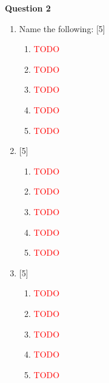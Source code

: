 \newpage
\par
\noindent
\textbf{Question 2}\\
\begin{enumerate}[label=(\roman*)]

    \item Name the following: \hfill [5]
        \begin{enumerate}[label=(\alph*)]
            \setlength\itemsep{0em}
            \item \textcolor{red}{TODO} 
            \item \textcolor{red}{TODO} 
            \item \textcolor{red}{TODO} 
            \item \textcolor{red}{TODO} 
            \item \textcolor{red}{TODO} 
        \end{enumerate}

    \item \hfill [5]
        \begin{enumerate}[label=(\alph*)]
            \item \textcolor{red}{TODO} 
            \item \textcolor{red}{TODO} 
            \item \textcolor{red}{TODO} 
            \item \textcolor{red}{TODO} 
            \item \textcolor{red}{TODO} 
        \end{enumerate}

    \item \hfill [5]
        \begin{enumerate}[label=(\alph*)]
            \item \textcolor{red}{TODO} 
            \item \textcolor{red}{TODO} 
            \item \textcolor{red}{TODO} 
            \item \textcolor{red}{TODO} 
            \item \textcolor{red}{TODO} 
        \end{enumerate}


\end{enumerate}

